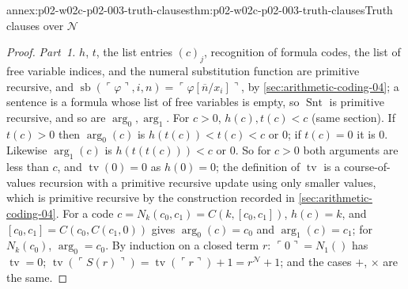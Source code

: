 \begin{annexitem}{annex:p02-w02c-p02-003-truth-clauses}{thm:p02-w02c-p02-003-truth-clauses}{Truth clauses over \(\mathcal N\)}
\begin{proof}
\emph{Part~1.}  \(h\), \(t\), the list entries \((c)_j\), recognition of
formula codes, the list of free variable indices, and the numeral
substitution function are primitive recursive, and
\(\operatorname{sb}(\ulcorner\varphi\urcorner,i,n)=\ulcorner\varphi[\overline n/x_i]\urcorner\),
by \cref{sec:arithmetic-coding-04}; a sentence is a formula whose list of
free variables is empty, so \(\operatorname{Snt}\) is primitive recursive,
and so are \(\operatorname{arg}_0,\operatorname{arg}_1\).  For \(c>0\),
\(h(c),t(c)<c\) (same section).  If \(t(c)>0\) then
\(\operatorname{arg}_0(c)\) is \(h(t(c))<t(c)<c\) or \(0\); if
\(t(c)=0\) it is \(0\).  Likewise \(\operatorname{arg}_1(c)\) is
\(h(t(t(c)))<c\) or \(0\).  So for \(c>0\) both arguments are less than
\(c\), and \(\operatorname{tv}(0)=0\) as \(h(0)=0\); the definition of
\(\operatorname{tv}\) is a course-of-values recursion with a primitive
recursive update using only smaller values, which is primitive recursive by
the construction recorded in \cref{sec:arithmetic-coding-04}.  For a code
\(c=N_k(c_0,c_1)=C(k,[c_0,c_1])\), \(h(c)=k\), and
\([c_0,c_1]=C(c_0,C(c_1,0))\) gives \(\operatorname{arg}_0(c)=c_0\) and
\(\operatorname{arg}_1(c)=c_1\); for \(N_k(c_0)\),
\(\operatorname{arg}_0=c_0\).  By induction on a closed term \(r\):
\(\ulcorner0\urcorner=N_1()\) has \(\operatorname{tv}=0\);
\(\operatorname{tv}(\ulcorner S(r)\urcorner)=\operatorname{tv}(\ulcorner r\urcorner)+1=r^{\mathcal N}+1\);
and the cases \(+\), \(\times\) are the same.


\end{proof}
\end{annexitem}

